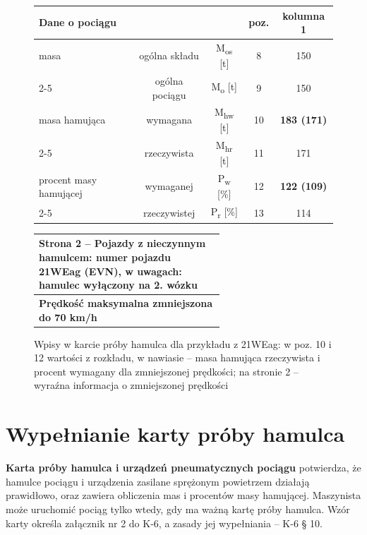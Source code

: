 \begin{figure}
	\centering
	\footnotesize
	\setlength{\tabcolsep}{4pt}
	\renewcommand{\arraystretch}{1.15}
	\begin{tabular}{|l|c|c|c|c|}
		\hline
		\multicolumn{3}{|l|}{\textbf{Dane o pociągu}} & poz. & \textbf{kolumna 1} \\
		\hline
		masa & ogólna składu & M\textsubscript{os} [t] & 8 & 150 \\ \cline{2-5}
		 & ogólna pociągu & M\textsubscript{o} [t] & 9 & 150 \\ \hline
		masa hamująca & wymagana & M\textsubscript{hw} [t] & 10 & \cellcolor{orange!25}\textbf{183 (171)} \\ \cline{2-5}
		 & rzeczywista & M\textsubscript{hr} [t] & 11 & 171 \\ \hline
		procent masy hamującej & wymaganej & P\textsubscript{w} [\%] & 12 & \cellcolor{orange!25}\textbf{122 (109)} \\ \cline{2-5}
		 & rzeczywistej & P\textsubscript{r} [\%] & 13 & 114 \\ \hline
	\end{tabular}

	\vspace{2mm}
	\begin{tabular}{|p{0.62\linewidth}|}
		\hline
		\textbf{Strona 2 – Pojazdy z nieczynnym hamulcem:} numer pojazdu 21WEag (EVN), w uwagach: hamulec wyłączony na 2. wózku \\
		\hline
		\cellcolor{red!15}\centering\textbf{Prędkość maksymalna zmniejszona do 70 km/h} \tabularnewline
		\hline
	\end{tabular}
	\caption{Wpisy w karcie próby hamulca dla przykładu z 21WEag: w poz. 10 i 12 wartości z rozkładu, w nawiasie – masa hamująca rzeczywista i procent wymagany dla zmniejszonej prędkości; na stronie 2 – wyraźna informacja o zmniejszonej prędkości}
	\label{fig:karta-zmniejszona}
\end{figure}

\chapter{Wypełnianie karty próby hamulca}
\label{ch:karta}

\textbf{Karta próby hamulca i urządzeń pneumatycznych pociągu} potwierdza, że hamulce pociągu i urządzenia zasilane sprężonym powietrzem działają prawidłowo, oraz zawiera obliczenia mas i procentów masy hamującej. Maszynista może uruchomić pociąg tylko wtedy, gdy ma ważną kartę próby hamulca. Wzór karty określa załącznik nr 2 do K-6, a zasady jej wypełniania – K-6 § 10.


